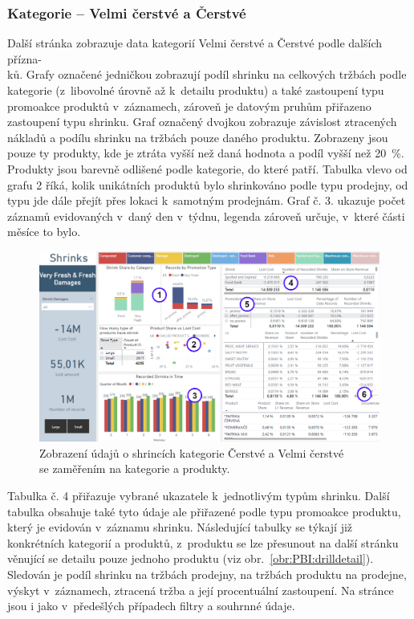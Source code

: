 \subsubsection*{Kategorie -- Velmi čerstvé a Čerstvé}

Další stránka zobrazuje data kategorií Velmi čerstvé a Čerstvé podle dalších přízna-\\ků. Grafy označené jedničkou zobrazují podíl shrinku na celkových tržbách podle kategorie (z~libovolné úrovně až k~detailu produktu) a také zastoupení typu promoakce produktů v~záznamech, zároveň je datovým pruhům přiřazeno zastoupení typu shrinku. Graf označený dvojkou zobrazuje závislost ztracených nákladů a podílu shrinku na tržbách pouze daného produktu. Zobrazeny jsou pouze ty produkty, kde je ztráta vyšší než daná hodnota a podíl vyšší než 20~\%. Produkty jsou barevně odlišené podle kategorie, do které patří. Tabulka vlevo od grafu 2 říká, kolik unikátních produktů bylo shrinkováno podle typu prodejny, od typu jde dále přejít přes lokaci k~samotným prodejnám. Graf č. 3. ukazuje počet záznamů evidovaných v~daný den v~týdnu, legenda zároveň určuje, v~které části měsíce to bylo. 

\begin{figure}[h!]
    \centering
    \captionsetup{justification=centering}
    \includegraphics[width=\textwidth]{obrazky/PBI/levelsSFFkopie.png}
    \caption{Zobrazení údajů o shrincích kategorie Čerstvé a Velmi čerstvé \\ se zaměřením na kategorie a produkty.}
    \label{obr:PBI:levelsSFF}
\end{figure}

Tabulka č. 4 přiřazuje vybrané ukazatele k~jednotlivým typům shrinku. Další tabulka obsahuje také tyto údaje ale přiřazené podle typu promoakce produktu, který je evidován v~záznamu shrinku. Následující tabulky se týkají již konkrétních kategorií a produktů, z~produktu se lze přesunout na další stránku věnující se detailu pouze jednoho produktu (viz obr.~\ref*{obr:PBI:drilldetail}). Sledován je podíl shrinku na tržbách prodejny, na tržbách produktu na prodejne, výskyt v~záznamech, ztracená tržba a její procentuální zastoupení. Na stránce jsou i jako v~předešlých případech filtry a souhrnné údaje.


